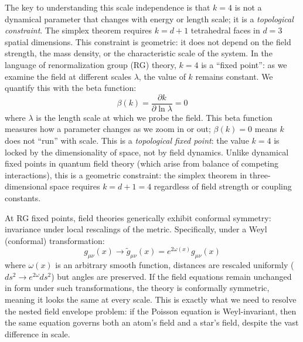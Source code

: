 
The key to understanding this scale independence is that $k=4$ is not a dynamical parameter that changes with energy or length scale; it is a \emph{topological constraint}. The simplex theorem requires $k = d+1$ tetrahedral faces in $d=3$ spatial dimensions. This constraint is geometric: it does not depend on the field strength, the mass density, or the characteristic scale of the system. In the language of renormalization group (RG) theory, $k=4$ is a ``fixed point'': as we examine the field at different scales $\lambda$, the value of $k$ remains constant. We quantify this with the beta function:
\begin{equation}
\beta(k) = \frac{\partial k}{\partial \ln \lambda} = 0
\label{eq:beta-function}
\end{equation}
where $\lambda$ is the length scale at which we probe the field. This beta function measures how a parameter changes as we zoom in or out; $\beta(k) = 0$ means $k$ does not ``run'' with scale. This is a \emph{topological fixed point}: the value $k=4$ is locked by the dimensionality of space, not by field dynamics. Unlike dynamical fixed points in quantum field theory (which arise from balance of competing interactions), this is a geometric constraint: the simplex theorem in three-dimensional space requires $k = d+1 = 4$ regardless of field strength or coupling constants.

At RG fixed points, field theories generically exhibit conformal symmetry: invariance under local rescalings of the metric. Specifically, under a Weyl (conformal) transformation:
\begin{equation}
g_{\mu\nu}(x) \to \tilde{g}_{\mu\nu}(x) = e^{2\omega(x)} g_{\mu\nu}(x)
\label{eq:weyl-transformation}
\end{equation}
where $\omega(x)$ is an arbitrary smooth function, distances are rescaled uniformly ($ds^2 \to e^{2\omega} ds^2$) but angles are preserved. If the field equations remain unchanged in form under such transformations, the theory is conformally symmetric, meaning it looks the same at every scale. This is exactly what we need to resolve the nested field envelope problem: if the Poisson equation is Weyl-invariant, then the same equation governs both an atom's field and a star's field, despite the vast difference in scale.

